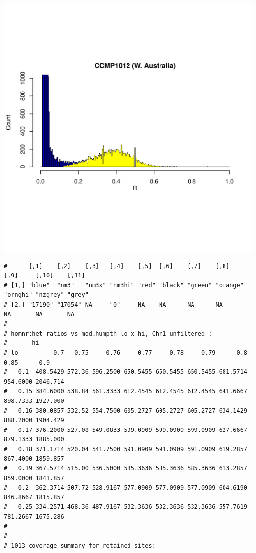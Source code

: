 \documentclass{article}\usepackage[]{graphicx}\usepackage[]{color}
\makeatletter
\def\maxwidth{ %
  \ifdim\Gin@nat@width>\linewidth
    \linewidth
  \else
    \Gin@nat@width
  \fi
}
\newenvironment{kframe}{%
 \def\at@end@of@kframe{}%
 \ifinner\ifhmode%
  \def\at@end@of@kframe{\end{minipage}}%
  \begin{minipage}{\columnwidth}%
 \fi\fi%
 \def\FrameCommand##1{\hskip\@totalleftmargin \hskip-\fboxsep
 \colorbox{shadecolor}{##1}\hskip-\fboxsep
     \hskip-\linewidth \hskip-\@totalleftmargin \hskip\columnwidth}%
 \MakeFramed {\advance\hsize-\width
   \@totalleftmargin\z@ \linewidth\hsize
   \@setminipage}}%
 {\par\unskip\endMakeFramed%
 \at@end@of@kframe}
\newenvironment{knitrout}{}{} %
\makeatother
\begin{document}
\begin{knitrout}
\includegraphics[width=\maxwidth]{FigS7-hwe-histo-figs-knitr/unnamed-chunk-10-17} 
\begin{kframe}\begin{verbatim}
#      [,1]    [,2]    [,3]   [,4]    [,5]  [,6]    [,7]    [,8]     [,9]     [,10]    [,11] 
# [1,] "blue"  "nm3"   "nm3x" "nm3hi" "red" "black" "green" "orange" "ornghi" "nzgrey" "grey"
# [2,] "17190" "17054" NA     "0"     NA    NA      NA      NA       NA       NA       NA
# 
# homnr:het ratios vs mod.humpth lo x hi, Chr1-unfiltered :
#       hi
# lo          0.7   0.75     0.76     0.77     0.78     0.79      0.8     0.85      0.9
#   0.1  408.5429 572.36 596.2500 650.5455 650.5455 650.5455 681.5714 954.6000 2046.714
#   0.15 384.6000 538.84 561.3333 612.4545 612.4545 612.4545 641.6667 898.7333 1927.000
#   0.16 380.0857 532.52 554.7500 605.2727 605.2727 605.2727 634.1429 888.2000 1904.429
#   0.17 376.2000 527.08 549.0833 599.0909 599.0909 599.0909 627.6667 879.1333 1885.000
#   0.18 371.1714 520.04 541.7500 591.0909 591.0909 591.0909 619.2857 867.4000 1859.857
#   0.19 367.5714 515.00 536.5000 585.3636 585.3636 585.3636 613.2857 859.0000 1841.857
#   0.2  362.3714 507.72 528.9167 577.0909 577.0909 577.0909 604.6190 846.8667 1815.857
#   0.25 334.2571 468.36 487.9167 532.3636 532.3636 532.3636 557.7619 781.2667 1675.286
# 
# 
# 1013 coverage summary for retained sites:

\end{verbatim}
\end{kframe}
\end{knitrout}
\end{document}

